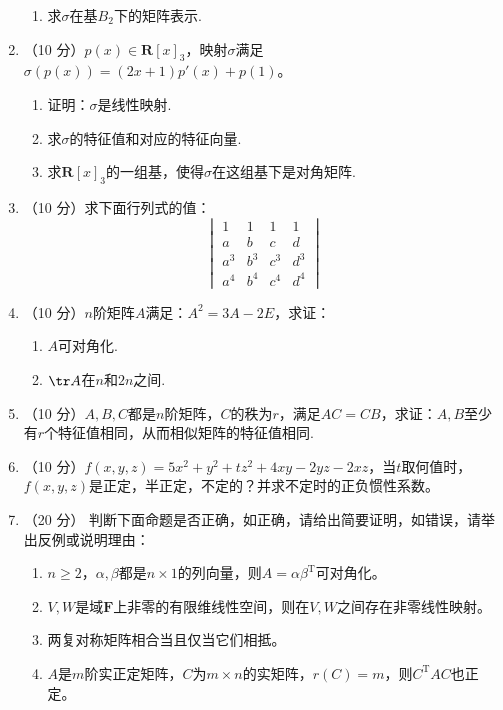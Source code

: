 \begin{enumerate}
\begin{enumerate}
        \item 求\(\sigma\)在基\(B_2\)下的矩阵表示.
    \end{enumerate}

    \item （10 分）\(p(x)\in\mathbf{R}[x]_3\)，映射\(\sigma\)满足\(\sigma(p(x))=(2x+1)p'(x)+p(1)\)。
    \begin{enumerate}
        \item 证明：\(\sigma\)是线性映射.

        \item 求\(\sigma\)的特征值和对应的特征向量.

        \item 求\(\mathbf{R}[x]_3\)的一组基，使得\(\sigma\)在这组基下是对角矩阵.
    \end{enumerate}

    \item （10 分）求下面行列式的值：
    \[ \begin{vmatrix}
        1 & 1 & 1 & 1 \\
        a & b & c & d \\
        a^3 & b^3 & c^3 & d^3 \\
        a^4 & b^4 & c^4 & d^4
    \end{vmatrix} \]

    \item （10 分）\(n\)阶矩阵\(A\)满足：\(A^2=3A-2E\)，求证：
    \begin{enumerate}
        \item \(A\)可对角化.

        \item \(\tr A\)在\(n\)和\(2n\)之间.
    \end{enumerate}

    \item （10 分）\(A,B,C\)都是\(n\)阶矩阵，\(C\)的秩为\(r\)，满足\(AC=CB\)，求证：\(A,B\)至少有\(r\)个特征值相同，从而相似矩阵的特征值相同.

    \item （10 分）\(f(x,y,z)=5x^2+y^2+tz^2+4xy-2yz-2xz\)，当\(t\)取何值时，\(f(x,y,z)\)是正定，半正定，不定的？并求不定时的正负惯性系数。

    \item （20 分）
    判断下面命题是否正确，如正确，请给出简要证明，如错误，请举出反例或说明理由：
    \begin{enumerate}
        \item \(n\geqslant 2\)，\(\alpha,\beta\)都是\(n\times1\)的列向量，则\(A=\alpha\beta^\mathrm{T}\)可对角化。

        \item \(V,W\)是域\(\mathbf{F}\)上非零的有限维线性空间，则在\(V,W\)之间存在非零线性映射。

        \item 两复对称矩阵相合当且仅当它们相抵。

        \item \(A\)是\(m\)阶实正定矩阵，\(C\)为\(m\times n\)的实矩阵，\(r(C)=m\)，则\(C^\mathrm{T}AC\)也正定。
    \end{enumerate}
\end{enumerate}
